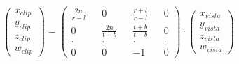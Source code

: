 \begin{figure}[h]
  \[
  \begin{pmatrix}
    x_{clip} \\ y_{clip} \\ z_{clip} \\ w_{clip}
  \end{pmatrix}
  =
  \begin{pmatrix}
    \frac{2n}{r-l} &&              0 && \frac{r+l}{r-l} &&     0 \\
                 0 && \frac{2n}{t-b} && \frac{t+b}{t-b} &&     0 \\
             \cdot &&          \cdot &&           \cdot && \cdot \\
                 0 &&              0 &&              -1 &&     0
  \end{pmatrix}
  \cdot
  \begin{pmatrix}
    x_{vista} \\ y_{vista} \\ z_{vista} \\ w_{vista}
  \end{pmatrix}
  \]
\end{figure}

